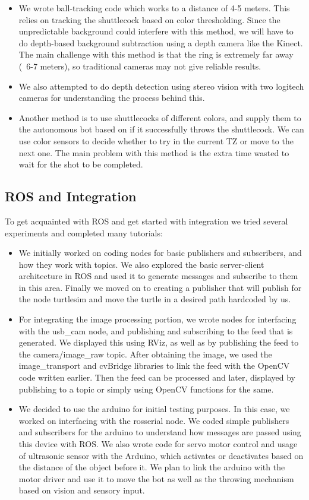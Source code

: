\documentclass[11pt]{article}
\begin{document}
\begin{itemize}
\item{We wrote ball-tracking code which works to a distance of 4-5 meters. This relies on tracking the shuttlecock based on color thresholding. Since the unpredictable background could interfere with this method, we will have to do depth-based background subtraction using a depth camera like the Kinect. The main challenge with this method is that the ring is extremely far away (~6-7 meters), so traditional cameras may not give reliable results.}

\item{We also attempted to do depth detection using stereo vision with two logitech cameras for understanding the process behind this.}

\item{Another method is to use shuttlecocks of different colors, and supply them to the autonomous bot based on if it successfully throws the shuttlecock. We can use color sensors to decide whether to try in the current TZ or move to the next one. The main problem with this method is the extra time wasted to wait for the shot to be completed.}
\end{itemize}

\subsection{ROS and Integration}
To get acquainted with ROS and get started with integration we tried several experiments and completed many tutorials:
\begin{itemize}
\item{We initially worked on coding nodes for basic publishers and subscribers, and how they work with topics. We also explored the basic server-client architecture in ROS and used it to generate messages and subscribe to them in this area. Finally we moved on to creating a publisher that will publish for the node turtlesim and move the turtle in a desired path hardcoded by us.}
\item{For integrating the image processing portion, we wrote nodes for interfacing with the usb\_cam node, and publishing and subscribing to the feed that is generated. We displayed this using RViz, as well as by publishing the feed to the camera/image\_raw topic. After obtaining the image, we used the image\_transport and cvBridge libraries to link the feed with the OpenCV code written earlier. Then the feed can be processed and later, displayed by publishing to a topic or simply using OpenCV functions for the same.}
\item{We decided to use the arduino for initial testing purposes. In this case, we worked on interfacing with the rosserial node. We coded simple publishers and subscribers for the arduino to understand how messages are passed using this device with ROS. We also wrote code for servo motor control and usage of ultrasonic sensor with the Arduino, which activates or deactivates based on the distance of the object before it. We plan to link the arduino with the motor driver and use it to move the bot as well as the throwing mechanism based on vision and sensory input. 
}
\end{itemize}
\end{document}
